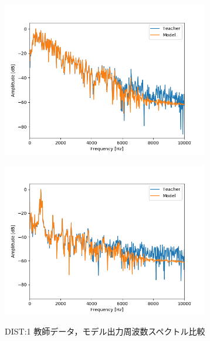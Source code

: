 \documentclass{jreport}		%
\begin{document}
\begin{figure}[htbp]
 \begin{minipage}{0.5\hsize}
 \begin{center}
  \includegraphics[width=90mm]{gain1_fft_hikaku.png}
 \end{center}
 \label{fig:one}
 \end{minipage}
 \begin{minipage}{0.5\hsize}
 \begin{center}
  \includegraphics[width=90mm]{gain1_fft_hikaku2.png}
 \end{center}
 \label{fig:two}
 \end{minipage}
 \caption{DIST:1 教師データ，モデル出力周波数スペクトル比較}
\end{figure}
\end{document}
